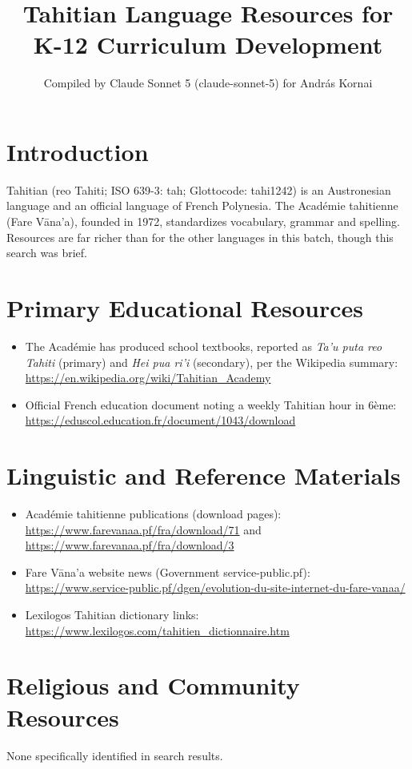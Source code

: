 \documentclass[12pt]{article}
\title{Tahitian Language Resources for K-12 Curriculum Development}
\author{Compiled by Claude Sonnet 5 (claude-sonnet-5) for Andr\'as Kornai}
\date{}
\begin{document}
\maketitle

\section{Introduction}
Tahitian (reo Tahiti; ISO 639-3: tah; Glottocode: tahi1242) is an Austronesian language and an official language of French Polynesia. The Acad\'emie tahitienne (Fare V\=ana'a), founded in 1972, standardizes vocabulary, grammar and spelling. Resources are far richer than for the other languages in this batch, though this search was brief.

\section{Primary Educational Resources}
\begin{itemize}
\item The Acad\'emie has produced school textbooks, reported as \emph{Ta'u puta reo Tahiti} (primary) and \emph{Hei pua ri'i} (secondary), per the Wikipedia summary: \url{https://en.wikipedia.org/wiki/Tahitian_Academy}
\item Official French education document noting a weekly Tahitian hour in 6\`eme: \url{https://eduscol.education.fr/document/1043/download}
\end{itemize}

\section{Linguistic and Reference Materials}
\begin{itemize}
\item Acad\'emie tahitienne publications (download pages): \url{https://www.farevanaa.pf/fra/download/71} and \url{https://www.farevanaa.pf/fra/download/3}
\item Fare V\=ana'a website news (Government service-public.pf): \url{https://www.service-public.pf/dgen/evolution-du-site-internet-du-fare-vanaa/}
\item Lexilogos Tahitian dictionary links: \url{https://www.lexilogos.com/tahitien_dictionnaire.htm}
\end{itemize}

\section{Religious and Community Resources}
None specifically identified in search results.
\end{document}

